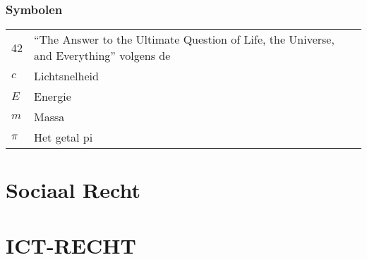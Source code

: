 \documentclass[master=ucll,11pt,dutch,twoside]{kulemt}
\begin{document}
\section*{Symbolen}
\begin{flushleft}
  \renewcommand{\arraystretch}{1.1}
  \begin{tabularx}{\textwidth}{@{}p{12mm}X@{}}
    42    & ``The Answer to the Ultimate Question of Life, the Universe,
            and Everything'' volgens de \cite{h2g2} \\
    $c$   & Lichtsnelheid \\
    $E$   & Energie \\
    $m$   & Massa \\
    $\pi$ & Het getal pi \\
  \end{tabularx}
\end{flushleft}


\mainmatter




\pagestyle{ruledfilip}

%

\part{Sociaal Recht}












%

\part{ICT-RECHT}
\end{document}
